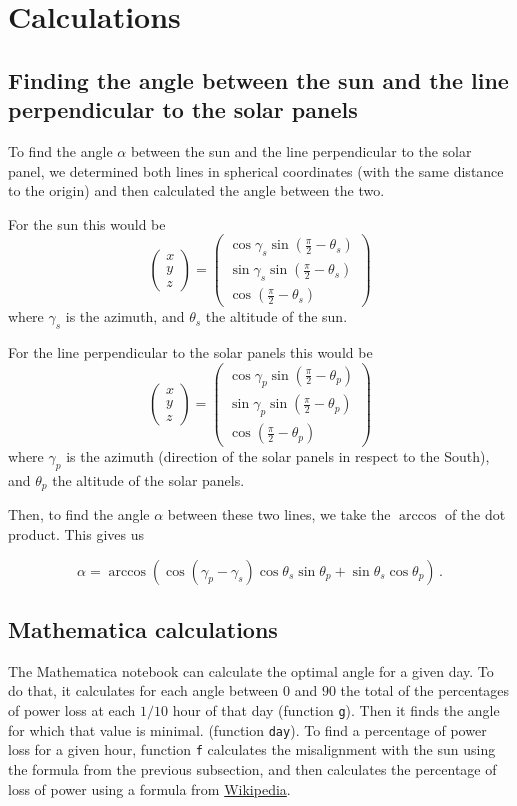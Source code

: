\documentclass{article}
\newcommand{\vvec}[1]{\begin{pmatrix} #1 \end{pmatrix}}
\begin{document}
	\section{Calculations}
		\subsection{Finding the angle between the sun and the line perpendicular to the solar panels}
			To find the angle $\alpha$ between the sun and the line perpendicular to the solar panel, we determined both lines in spherical coordinates (with the same distance to the origin) and then calculated the angle between the two. 
			
			For the sun this would be
			\[ 
				\vvec{x \\ y \\ z} = 
				\vvec{\cos \gamma_s \sin (\frac{\pi}{2} - \theta_s) \\ 
					\sin \gamma_s \sin (\frac{\pi}{2} - \theta_s) \\
					\cos (\frac{\pi}{2} - \theta_s)}
			 \]
			 where $ \gamma_s $ is the azimuth, and $ \theta_s $ the altitude of the sun. 
			 
			 For the line perpendicular to the solar panels this would be
			 \[ 
				 \vvec{x \\ y \\ z} = 
				 \vvec{\cos \gamma_p \sin (\frac{\pi}{2} - \theta_p) \\ 
				 	\sin \gamma_p \sin (\frac{\pi}{2} - \theta_p) \\
				 	\cos (\frac{\pi}{2} - \theta_p)}
			  \]
			  where $ \gamma_p $ is the azimuth (direction of the solar panels in respect to the South), and $ \theta_p $ the altitude of the solar panels.
			  
			  Then, to find the angle $\alpha$ between these two lines, we take the $ \arccos $ of the dot product. This gives us
			  
			  \[ 
				  \alpha = \arccos (\cos (\gamma_p - \gamma_s) \cos \theta_s \sin \theta_p + \sin \theta_s \cos \theta_p)\,.
			   \]
			   
			   \subsection{Mathematica calculations}
			   
			   The Mathematica notebook can calculate the optimal angle for a given day. To do that, it calculates for each angle between $0$ and $90$ the total of the percentages of power loss at each $1/10$ hour of that day (function \verb|g|). Then it finds the angle for which that value is minimal. (function \verb|day|).  To find a percentage of power loss for a given hour, function \verb|f| calculates the misalignment with the sun using the formula from the previous subsection, and then calculates the percentage of loss of power using a formula from \href{https://en.wikipedia.org/wiki/Solar_tracker#/media/File:SolarPanel_alignment.png}{Wikipedia}.
			   
\end{document}
